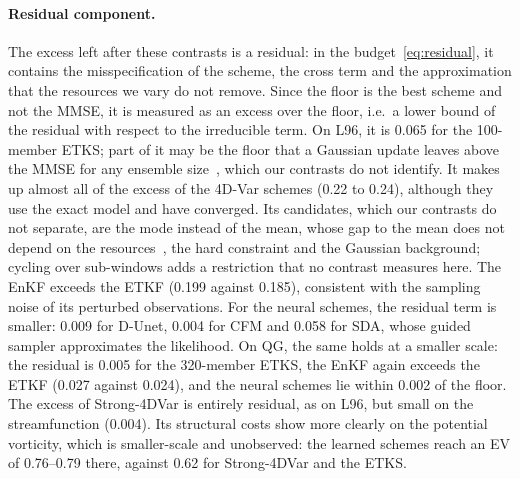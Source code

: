 \paragraph{Residual component.}
The excess left after these contrasts is a residual: in the budget~\eqref{eq:residual}, it
contains the misspecification of the scheme, the cross term and the approximation that the
resources we vary do not remove. Since the floor is the best scheme and not the MMSE, it is
measured as an excess over the floor, i.e.\ a lower bound of the residual with respect to the
irreducible term. On L96, it is 0.065 for the 100-member ETKS; part of it may be the floor that a
Gaussian update leaves above the MMSE for any ensemble size~\cite{fablet_not_2026}, which our
contrasts do not identify. It makes up almost all of the excess of the 4D-Var schemes
(0.22 to 0.24), although they use the exact model and have converged. Its candidates, which our
contrasts do not separate, are the
mode instead of the mean, whose gap to the mean does not depend on the
resources~\cite{fablet_not_2026}, the hard constraint and the Gaussian background; cycling over
sub-windows adds a restriction that no contrast measures here. The EnKF exceeds the ETKF (0.199 against 0.185), consistent with the
sampling noise of its perturbed observations. For the neural schemes, the residual
term is smaller: 0.009 for D-Unet, 0.004 for CFM and 0.058 for SDA, whose guided sampler
approximates the likelihood. On QG, the same holds at a smaller scale: the residual
is 0.005 for the 320-member ETKS, the EnKF again exceeds the ETKF (0.027 against 0.024),
and the neural schemes lie within 0.002 of the floor. The excess of Strong-4DVar is entirely
residual, as on L96, but small on the streamfunction (0.004). Its structural costs show more
clearly on the potential vorticity, which is smaller-scale and unobserved: the learned schemes
reach an EV of 0.76--0.79 there, against 0.62 for Strong-4DVar and the ETKS.

